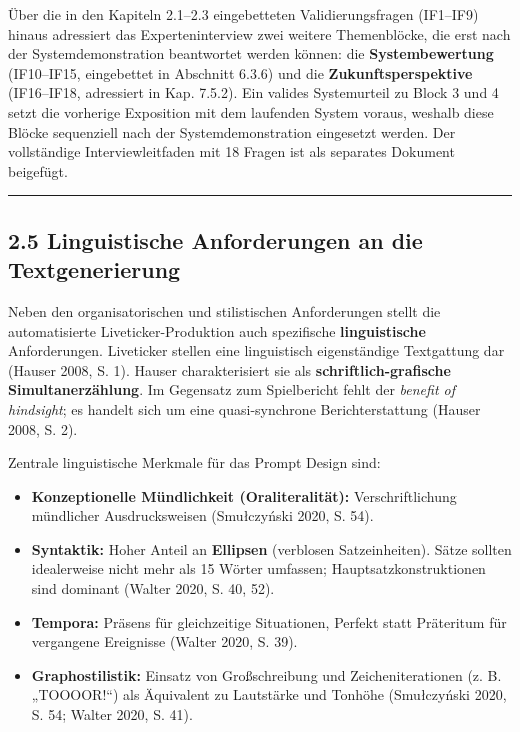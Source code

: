 Über die in den Kapiteln 2.1--2.3 eingebetteten Validierungsfragen
(IF1--IF9) hinaus adressiert das Experteninterview zwei weitere
Themenblöcke, die erst nach der Systemdemonstration beantwortet werden
können: die \textbf{Systembewertung} (IF10--IF15, eingebettet in
Abschnitt 6.3.6) und die \textbf{Zukunftsperspektive} (IF16--IF18,
adressiert in Kap. 7.5.2). Ein valides Systemurteil zu Block 3 und 4
setzt die vorherige Exposition mit dem laufenden System voraus, weshalb
diese Blöcke sequenziell nach der Systemdemonstration eingesetzt werden.
Der vollständige Interviewleitfaden mit 18 Fragen ist als separates
Dokument beigefügt.

\begin{center}\rule{0.5\linewidth}{0.5pt}\end{center}

\subsection{2.5 Linguistische Anforderungen an die
Textgenerierung}\label{linguistische-anforderungen-an-die-textgenerierung}

Neben den organisatorischen und stilistischen Anforderungen stellt die
automatisierte Liveticker-Produktion auch spezifische
\textbf{linguistische} Anforderungen. Liveticker stellen eine
linguistisch eigenständige Textgattung dar (Hauser 2008, S. 1). Hauser
charakterisiert sie als \textbf{schriftlich-grafische
Simultanerzählung}. Im Gegensatz zum Spielbericht fehlt der
\emph{benefit of hindsight}; es handelt sich um eine quasi-synchrone
Berichterstattung (Hauser 2008, S. 2).

Zentrale linguistische Merkmale für das Prompt Design sind:

\begin{itemize}
\tightlist
\item
  \textbf{Konzeptionelle Mündlichkeit (Oraliteralität):}
  Verschriftlichung mündlicher Ausdrucksweisen (Smułczyński 2020, S.
  54).
\item
  \textbf{Syntaktik:} Hoher Anteil an \textbf{Ellipsen} (verblosen
  Satzeinheiten). Sätze sollten idealerweise nicht mehr als 15 Wörter
  umfassen; Hauptsatzkonstruktionen sind dominant (Walter 2020, S. 40,
  52).
\item
  \textbf{Tempora:} Präsens für gleichzeitige Situationen, Perfekt statt
  Präteritum für vergangene Ereignisse (Walter 2020, S. 39).
\item
  \textbf{Graphostilistik:} Einsatz von Großschreibung und
  Zeicheniterationen (z. B. „TOOOOR!{\kern0pt}``) als Äquivalent zu
  Lautstärke und Tonhöhe (Smułczyński 2020, S. 54; Walter 2020, S. 41).
\end{itemize}


